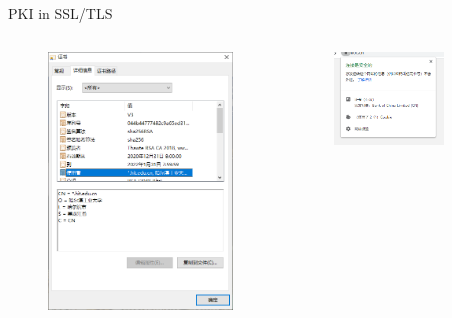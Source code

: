 \documentclass[UTF8]{ctexbeamer}
\begin{document}
\begin{frame}{PKI in SSL/TLS}
\begin{columns}
        \begin{column}{0.25\textwidth}
            \begin{figure}
                \centering
                \includegraphics[width=\textwidth]{ov.png}
            \end{figure}
        \end{column}
        \begin{column}{0.25\textwidth}
            \begin{figure}
                \centering
                \includegraphics[width=0.8\textwidth]{ev-1.png}

\end{figure}
\end{column}
\end{columns}
\end{frame}
\end{document}
